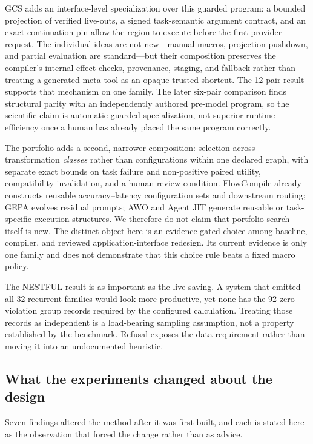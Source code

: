 GCS adds an interface-level specialization over this guarded program: a bounded projection
of verified live-outs, a signed task-semantic argument contract, and an exact continuation
pin allow the region to execute before the first provider request.  The individual ideas
are not new---manual macros, projection pushdown, and partial evaluation are standard---but
their composition preserves the compiler's internal effect checks, provenance, staging,
and fallback rather than treating a generated meta-tool as an opaque trusted shortcut.
The 12-pair result supports that mechanism on one family.  The later six-pair comparison
finds structural parity with an independently authored pre-model program, so the scientific
claim is automatic guarded specialization, not superior runtime efficiency once a human has
already placed the same program correctly.

The portfolio adds a second, narrower composition: selection across transformation
\emph{classes} rather than configurations within one declared graph, with separate exact
bounds on task failure and non-positive paired utility, compatibility invalidation, and a
human-review condition.  FlowCompile already constructs reusable accuracy--latency
configuration sets and downstream routing; GEPA evolves residual prompts; AWO and Agent
JIT generate reusable or task-specific execution structures.  We therefore do not claim
that portfolio search itself is new.  The distinct object here is an evidence-gated choice
among baseline, compiler, and reviewed application-interface redesign.  Its current
evidence is only one family and does not demonstrate that this choice rule beats a fixed
macro policy.

The NESTFUL result is as important as the live saving.  A system that emitted all 32
recurrent families would look more productive, yet none has the 92 zero-violation group
records required by the configured calculation.  Treating those records as independent is
a load-bearing sampling assumption, not a property established by the benchmark.  Refusal
exposes the data requirement rather than moving it into an undocumented heuristic.

\subsection{What the experiments changed about the design}

Seven findings altered the method after it was first built, and each is stated here as the
observation that forced the change rather than as advice.

